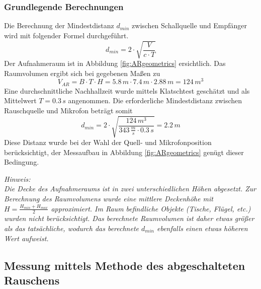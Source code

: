 \documentclass[11pt]{report}
\begin{document}
\subsubsection{Grundlegende Berechnungen}
Die Berechnung der Mindestdistanz $d_{min}$ zwischen Schallquelle und Empf\"anger wird mit folgender Formel durchgef\"uhrt.
\begin{equation}
d_{min}=2\cdot \sqrt{\frac{V}{c\cdot T}}
\label{eq:dmin}
\end{equation}
Der Aufnahmeraum ist in Abbildung \ref{fig:ARgeometrics} ersichtlich. Das Raumvolumen ergibt sich bei gegebenen Ma\ss en zu 
\begin{equation}
V_{AR} = B\cdot T\cdot H = 5.8\,m\cdot 7.4\,m\cdot 2.88\,m = 124\,m^{3}
\end{equation}
Eine durchschnittliche Nachhallzeit wurde mittels Klatschtest gesch\"atzt und als Mittelwert $T=0.3\,s$ angenommen. Die erforderliche Mindestdistanz zwischen Rauschquelle und Mikrofon betr\"agt somit
\begin{equation}
d_{min}=2\cdot \sqrt{\frac{124\,m^{3}}{343\,\frac{m}{s}\cdot 0.3\,s}} = 2.2\,m
\end{equation}
Diese Distanz wurde bei der Wahl der Quell- und Mikrofonposition ber\"ucksichtigt, der Messaufbau in Abbildung \ref{fig:ARgeometrics} gen\"ugt dieser Bedingung.
\begin{leftbar}
\textit{ Hinweis:\\
Die Decke des Aufnahmeraums ist in zwei unterschiedlichen H\"ohen abgesetzt. Zur Berechnung des Raumvolumens wurde eine mittlere Deckenh\"ohe mit $H=\frac{H_{min}+H_{max}}{2}$ approximiert. Im Raum befindliche Objekte (Tische, Fl\"ugel, etc.) wurden nicht ber\"ucksichtigt. Das berechnete Raumvolumen ist daher etwas gr\"o\ss er als das tats\"achliche, wodurch das berechnete $d_{min}$ ebenfalls einen etwas h\"oheren Wert aufweist.} 
\end{leftbar}
\subsection{Messung mittels Methode des abgeschalteten Rauschens}
\end{document}
